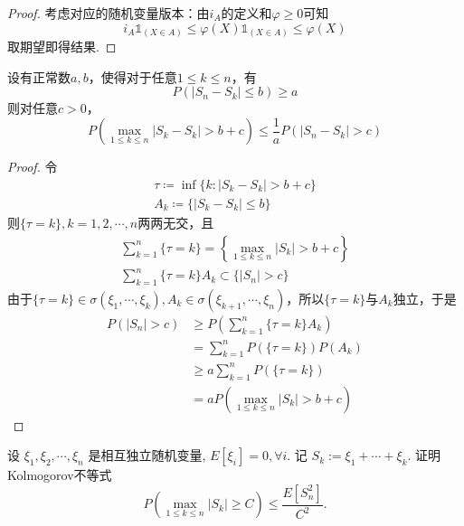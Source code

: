 \begin{proof}
    考虑对应的随机变量版本：由$i_A$的定义和$\varphi\ge 0$可知
    $$
        i_A \mathbb{1}_{(X\in A)}\le \varphi(X)\mathbb{1}_{(X\in A)}\le \varphi(X)
    $$
    取期望即得结果.
\end{proof}

\begin{theorem}
    设有正常数$a,b$，使得对于任意$1\le k\le n$，有
    \[
        P(|S_n-S_k|\le b)\ge a
    \]
    则对任意$c>0$，
    \[
        P(\max_{1\le k\le n}|S_k-S_k|> b+c)\le \frac{1}{a}P(|S_n-S_k|>c)
    \]
\end{theorem}

\begin{proof}
    令
    \begin{gather}
        \tau\coloneqq \inf\{k:|S_k-S_k|>b+c\} \\
        A_k\coloneqq \{|S_k-S_k|\le b\}
    \end{gather}
    则$\{\tau =k\},k=1,2,\cdots,n$两两无交，且
    \begin{gather}
        \sum_{k=1}^n \{\tau =k\}=\left\{\max_{1\le k\le n}|S_k|>b+c\right\}\\
        \sum_{k=1}^n \{\tau =k\}A_k\subset \{|S_n|>c\}
    \end{gather}
    由于$\{\tau=k\}\in\sigma(\xi_1,\cdots,\xi_k),A_k\in\sigma(\xi_{k+1},\cdots,\xi_n)$，所以$\{\tau=k\}$与$A_k$独立，于是
    \begin{align*}
        P(|S_n|>c) & \ge P(\sum_{k=1}^n \{\tau =k\}A_k)  \\
                   & = \sum_{k=1}^n P(\{\tau =k\})P(A_k) \\
                   & \ge a\sum_{k=1}^n P(\{\tau =k\})    \\
                   & =aP(\max_{1\le k\le n}|S_k|>b+c)
    \end{align*}
\end{proof}

\begin{theorem}\label{thm:kolmogorov_inequality}
    设 $\xi_1, \xi_2, \cdots, \xi_n$ 是相互独立随机变量, $E\left[\xi_i\right]=0, \forall i$. 记 $S_k:=\xi_1+\cdots+\xi_k$. 证明Kolmogorov不等式
    $$
        P\left(\max _{1 \leqslant k \leqslant n}\left|S_k\right| \geqslant C\right) \leqslant \frac{E\left[S_n^2\right]}{C^2} .
    $$
\end{theorem}

